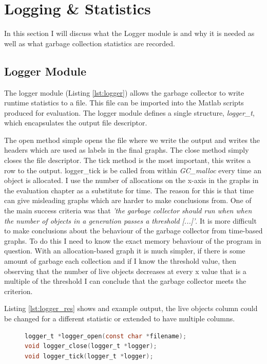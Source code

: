 \documentclass[../diss.tex]{subfiles}
\begin{document}
\section{Logging \& Statistics} \label{sec:logger}

In this section I will discuss what the Logger module is and why it is needed as well as what garbage collection statistics are recorded.

\subsection{Logger Module}

The logger module (Listing \ref{lst:logger}) allows the garbage collector to write runtime statistics to a file. This file can be imported into the Matlab scripts produced for evaluation. The logger module defines a single structure, \emph{logger\_t}, which encapsulates the output file descriptor.

The open method simple opens the file where we write the output and writes the headers which are used as labels in the final graphs. The close method simply closes the file descriptor. The tick method is the most important, this writes a row to the output. logger\_tick is be called from within \emph{GC\_malloc} every time an object is allocated. 
I use the number of allocations on the x-axis in the graphs in the evaluation chapter as a substitute for time. The reason for this is that time can give misleading graphs which are harder to make conclusions from. One of the main success criteria was that \emph{'the garbage collector should run when when the number of objects in a generation passes a threshold [...]'}. It is more difficult to make conclusions about the behaviour of the garbage collector from time-based graphs. To do this I need to know the exact memory behaviour of the program in question. With an allocation-based graph it is much simpler, if there is some amount of garbage each collection and if I know the threshold value, then observing that the number of live objects decreases at every x value that is a multiple of the threshold I can conclude that the garbage collector meets the criterion. 

Listing \ref{lst:logger_res} shows and example output, the live objects column could be changed for a different statistic or extended to have multiple columns.

\begin{figure}
\begin{lstlisting}[language=C, caption=Logger interface, label={lst:logger}]
logger_t *logger_open(const char *filename);
void logger_close(logger_t *logger);
void logger_tick(logger_t *logger);
\end{lstlisting}
\end{figure}
\end{document}
